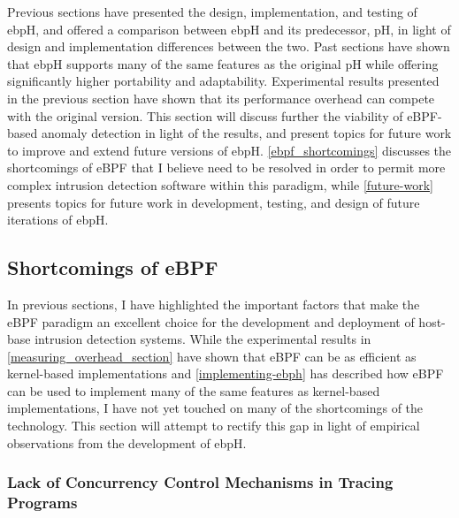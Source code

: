 \documentclass[
  12pt]{findlay}
\begin{document}
Previous sections have presented the design, implementation, and testing
of ebpH, and offered a comparison between ebpH and its predecessor, pH,
in light of design and implementation differences between the two. Past
sections have shown that ebpH supports many of the same features as the
original pH while offering significantly higher portability and
adaptability. Experimental results presented in the previous section
have shown that its performance overhead can compete with the original
version. This section will discuss further the viability of eBPF-based
anomaly detection in light of the results, and present topics for future
work to improve and extend future versions of ebpH.
\autoref{ebpf_shortcomings} discusses the shortcomings of eBPF that I
believe need to be resolved in order to permit more complex intrusion
detection software within this paradigm, while \autoref{future-work}
presents topics for future work in development, testing, and design of
future iterations of ebpH.

\hypertarget{shortcomings-of-ebpf}{%
\subsection{Shortcomings of eBPF}\label{shortcomings-of-ebpf}}

\label{ebpf_shortcomings}

In previous sections, I have highlighted the important factors that make
the eBPF paradigm an excellent choice for the development and deployment
of host-base intrusion detection systems. While the experimental results
in \autoref{measuring_overhead_section} have shown that eBPF can be as
efficient as kernel-based implementations and
\autoref{implementing-ebph} has described how eBPF can be used to
implement many of the same features as kernel-based implementations, I
have not yet touched on many of the shortcomings of the technology. This
section will attempt to rectify this gap in light of empirical
observations from the development of ebpH.

\hypertarget{lack-of-concurrency-control-mechanisms-in-tracing-programs}{%
\subsubsection{Lack of Concurrency Control Mechanisms in Tracing
Programs}\label{lack-of-concurrency-control-mechanisms-in-tracing-programs}}

\label{no_concurrency}
\end{document}
